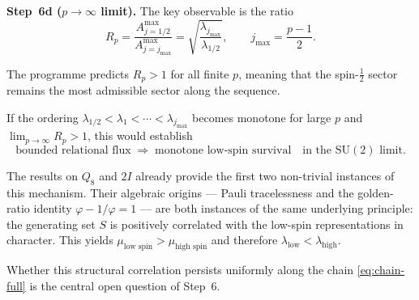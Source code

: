     \medskip
    \noindent\textbf{Step~6d ($p\to\infty$ limit).}
    The key observable is the ratio
    \begin{equation}
      R_p
      =
      \frac{A^{\max}_{j=1/2}}{A^{\max}_{j=j_{\max}}}
      =
      \sqrt{\frac{\lambda_{j_{\max}}}{\lambda_{1/2}}},
      \qquad
      j_{\max} = \frac{p-1}{2}.
      \label{eq:ratio-p}
    \end{equation}

    The programme predicts $R_p>1$ for all finite $p$,
    meaning that the spin-$\tfrac12$ sector remains the most
    admissible sector along the sequence.

    If the ordering
    $\lambda_{1/2} < \lambda_1 < \cdots < \lambda_{j_{\max}}$
    becomes monotone for large $p$ and
    $\lim_{p\to\infty} R_p > 1$,
    this would establish
    \begin{equation}
      \text{bounded relational flux}
      \;\Longrightarrow\;
      \text{monotone low-spin survival}
      \quad
      \text{in the }\mathrm{SU}(2)\text{ limit.}
      \label{eq:conclusion}
    \end{equation}

    The results on $Q_8$ and $2I$ already provide the first two
    non-trivial instances of this mechanism.
    Their algebraic origins — Pauli tracelessness and the golden-ratio
    identity $\varphi - 1/\varphi = 1$ — are both instances of the same
    underlying principle: the generating set $S$ is positively correlated
    with the low-spin representations in character.
    This yields
    $\mu_{\text{low spin}} > \mu_{\text{high spin}}$
    and therefore
    $\lambda_{\text{low}} < \lambda_{\text{high}}$.

    Whether this structural correlation persists uniformly along the chain
    \eqref{eq:chain-full} is the central open question of Step~6.
